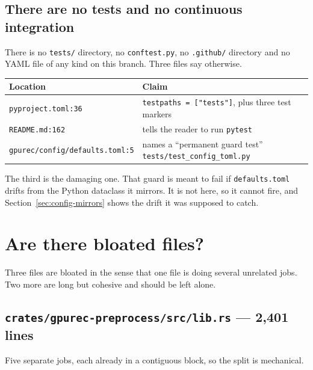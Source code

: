 \documentclass[11pt]{article}
\newcommand{\loc}[1]{\nolinkurl{#1}}
\newcommand{\dir}[1]{\nolinkurl{#1}}
\begin{document}
\subsection{There are no tests and no continuous integration}
\label{sec:no-tests}

There is no \dir{tests/} directory, no \texttt{conftest.py}, no \dir{.github/}
directory and no YAML file of any kind on this branch.  Three files say
otherwise.

\begin{center}
\begin{tabular}{@{}lp{}@{}}
\toprule
Location & Claim \\
\midrule
\loc{pyproject.toml:36}  & \texttt{testpaths = ["tests"]}, plus three test markers \\
\loc{README.md:162}      & tells the reader to run \texttt{pytest} \\
\loc{gpurec/config/defaults.toml:5} & names a ``permanent guard test'' \texttt{tests/test\_config\_toml.py} \\
\bottomrule
\end{tabular}
\end{center}

The third is the damaging one.  That guard is meant to fail if
\dir{defaults.toml} drifts from the Python dataclass it mirrors.  It is not
here, so it cannot fire, and Section~\ref{sec:config-mirrors} shows the drift
it was supposed to catch.

\section{Are there bloated files?}
\label{sec:bloat}

Three files are bloated in the sense that one file is doing several unrelated
jobs.  Two more are long but cohesive and should be left alone.

\subsection{\texorpdfstring{\dir{crates/gpurec-preprocess/src/lib.rs}}{lib.rs} --- 2{,}401 lines}

Five separate jobs, each already in a contiguous block, so the split is
mechanical.
\end{document}

